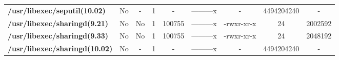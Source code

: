 \begin{center}
{\begin{tabular}{|>{\bfseries} l | C | C | C | C | C | C | C | C |}
					/usr/libexec/seputil(10.02) & No & - & 1 & - & ---------x & - & 4494204240 & -\\ 
					/usr/libexec/sharingd(9.21) & No & No & \color{green}1 & \color{red}100755 & \color{green}---------x & \color{red}-rwxr-xr-x & \color{green}24 & \color{red}2002592\\ 
					/usr/libexec/sharingd(9.33) & No & No & \color{green}1 & \color{red}100755 & \color{green}---------x & \color{red}-rwxr-xr-x & \color{green}24 & \color{red}2048192\\ 
					/usr/libexec/sharingd(10.02) & No & - & 1 & - & ---------x & - & 4494204240 & -\\ 

			\end{tabular}
		}
	\end{center}



